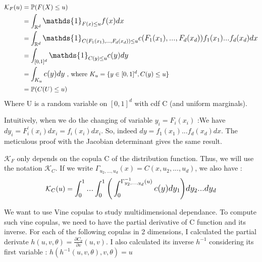 \documentclass{article}
\begin{document}
	\begin{multline*}
	\begin{split}
	\mathcal{K}_F (u)	&= \mathbb{P} (F(X) \leq u) \\
						&= \mathlarger{ \int_{\mathbb{R}^d} \mathds{1}_{F(x) \leq u}f(x) dx} \\
						&= \mathlarger{ \int_{\mathbb{R}^d} \mathds{1}_{C(F_1(x_1),...,F_d(x_d)) \leq u} c(F_1(x_1),...,F_d(x_d)) f_1(x_1)...f_d(x_d) dx} \\
						&= \mathlarger{ \int_{[0,1]^d} \mathds{1}_{C(y) \leq u} c(y) dy}\\
						&= \mathlarger{ \int_{K_u} c(y) dy} \text{	, where } K_u = \{ y\in [0,1]^d, C(y) \leq u \}\\
						&= \mathbb{P} (C(U) \leq u)
	\end{split}
	\end{multline*}
	Where U is a random variable on $[0,1]^d$ with cdf C (and uniform marginals).


	Intuitively, when we do the changing of variable $y_i=F_i(x_i)$ :\newline We have $dy_i = F_i^\prime (x_i) dx_i = f_i(x_i)dx_i$. So, indeed $dy = f_1(x_1)...f_d(x_d)dx$.\newline
	The meticulous proof with the Jacobian determinant gives the same result.
	\newline

	$\mathcal{K}_F$ only depends on the copula C of the distribution function.\newline
	Thus, we will use the notation $\mathcal{K}_C$. \newline
	If we write $\Gamma_{u_2,...,u_{d}}(x) = C(x,u_2,...,u_d)$, we also have :
	\begin{equation*}
	\mathcal{K}_C (u) = \mathlarger{ \int_0^1 ... \int_0^1 \bigg(\int_0^{\Gamma_{y_2,...,y_{d}}^{-1}(u)} c(y) dy_1 \bigg) dy_2...dy_d}
	\end{equation*}
	\newline


	We want to use Vine copulas to study multidimensional dependance. To compute such vine copulas, we need to have the partial derivative of C function and its inverse. For each of the following copulas in 2 dimensions, I calculated the partial derivate \begin{math} h(u,v,\theta) = \frac{\partial C_{\theta}}{\partial v} (u,v) \end{math}. I also calculated its inverse \begin{math} h^{-1} \end{math} considering its first variable : \begin{math} h(h^{-1}(u,v,\theta),v,\theta)=u \end{math}
\end{document}

